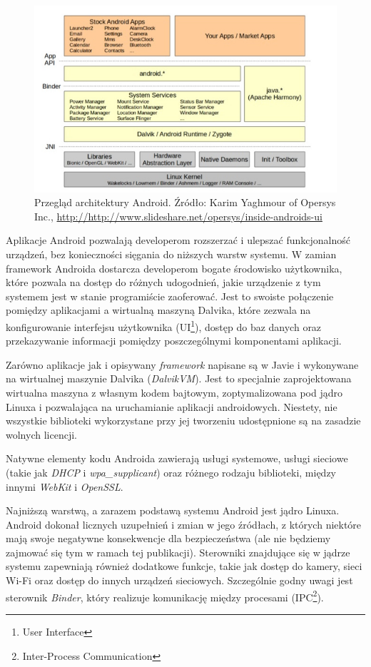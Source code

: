 \begin{figure}[!htb]
    \centering
    \includegraphics[width=17cm]{imgs/ch3_android_architecture_1.jpg}
    \caption
{Przegląd architektury Android. Źródło: Karim Yaghmour of Opersys Inc., \url{http://http://www.slideshare.net/opersys/inside-androids-ui}}
    \label{fig:ch3_android_architecture_1}
\end{figure} 

Aplikacje Android pozwalają developerom rozszerzać i ulepszać funkcjonalność urządzeń, bez konieczności sięgania do niższych warstw systemu. W zamian framework Androida dostarcza developerom bogate środowisko użytkownika, które pozwala na dostęp do różnych udogodnień, jakie urządzenie z tym systemem jest w stanie programiście zaoferować. Jest to swoiste połączenie pomiędzy aplikacjami a wirtualną maszyną Dalvika, które zezwala na konfigurowanie interfejsu użytkownika (UI\footnote{User Interface}), dostęp do baz danych oraz przekazywanie informacji pomiędzy poszczególnymi komponentami aplikacji.

Zarówno aplikacje jak i opisywany \textit{framework} napisane są w Javie i wykonywane na wirtualnej maszynie Dalvika (\textit{DalvikVM}). Jest to specjalnie zaprojektowana wirtualna maszyna z własnym kodem bajtowym, zoptymalizowana pod jądro Linuxa i pozwalająca na uruchamianie aplikacji androidowych. Niestety, nie wszystkie biblioteki wykorzystane przy jej tworzeniu udostępnione są na zasadzie wolnych licencji.

Natywne elementy kodu Androida zawierają usługi systemowe, usługi sieciowe (takie jak \textit{DHCP} i \textit{wpa\_supplicant}) oraz różnego rodzaju biblioteki, między innymi \textit{WebKit} i \textit{OpenSSL}. 

Najniższą warstwą, a zarazem podstawą systemu Android jest jądro Linuxa. Android dokonał licznych uzupełnień i zmian w jego źródłach, z których niektóre mają swoje negatywne konsekwencje dla bezpieczeństwa (ale nie będziemy zajmować się tym w ramach tej publikacji). Sterowniki znajdujące się w jądrze systemu zapewniają również dodatkowe funkcje, takie jak dostęp do kamery, sieci Wi-Fi oraz dostęp do innych urządzeń sieciowych. Szczególnie godny uwagi jest sterownik \textit{Binder}, który realizuje komunikację między procesami\cite{bib:hacker:handbook} (IPC\footnote{Inter-Process Communication}).

